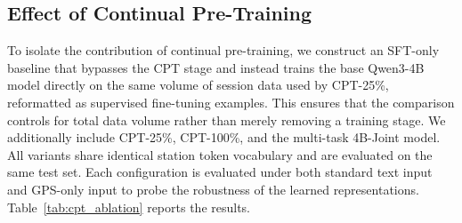 \documentclass{article}
\begin{document}
\subsection{Effect of Continual Pre-Training}
\label{app:cpt_ablation}

To isolate the contribution of continual pre-training, we construct an SFT-only baseline that bypasses the CPT stage and instead trains the base Qwen3-4B model directly on the same volume of session data used by CPT-25\%, reformatted as supervised fine-tuning examples. This ensures that the comparison controls for total data volume rather than merely removing a training stage. We additionally include CPT-25\%, CPT-100\%, and the multi-task 4B-Joint model. All variants share identical station token vocabulary and are evaluated on the same test set. Each configuration is evaluated under both standard text input and GPS-only input to probe the robustness of the learned representations. Table~\ref{tab:cpt_ablation} reports the results.
\end{document}
